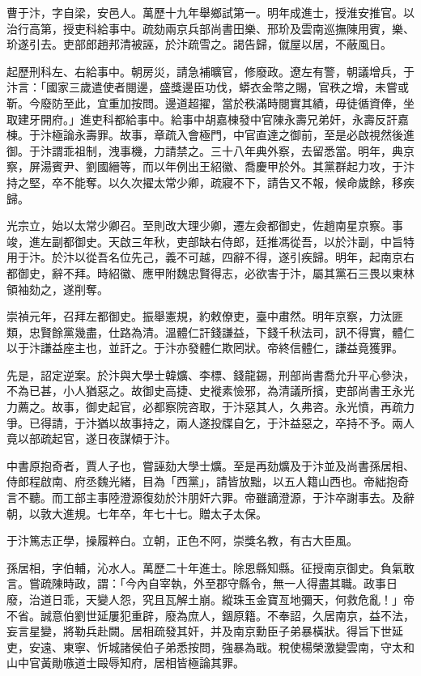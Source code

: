 \begin{pinyinscope}
曹于汴，字自梁，安邑人。萬歷十九年舉鄉試第一。明年成進士，授淮安推官。以治行高第，授吏科給事中。疏劾兩京兵部尚書田樂、邢玠及雲南巡撫陳用賓，樂、玠遂引去。吏部郎趙邦清被誣，於汴疏雪之。謁告歸，僦屋以居，不蔽風日。

起歷刑科左、右給事中。朝房災，請急補曠官，修廢政。遼左有警，朝議增兵，于汴言：「國家三歲遣使者閱邊，盛獎邊臣功伐，蟒衣金幣之賜，官秩之增，未嘗或靳。今廢防至此，宜重加按問。邊道超擢，當於秩滿時閱實其績，毋徒循資俸，坐取建牙開府。」進吏科都給事中。給事中胡嘉棟發中官陳永壽兄弟奸，永壽反訐嘉棟。于汴極論永壽罪。故事，章疏入會極門，中官直達之御前，至是必啟視然後進御。于汴謂乖祖制，洩事機，力請禁之。三十八年典外察，去留悉當。明年，典京察，屏湯賓尹、劉國縉等，而以年例出王紹徽、喬慶甲於外。其黨群起力攻，于汴持之堅，卒不能奪。以久次擢太常少卿，疏寢不下，請告又不報，候命歲餘，移疾歸。

光宗立，始以太常少卿召。至則改大理少卿，遷左僉都御史，佐趙南星京察。事竣，進左副都御史。天啟三年秋，吏部缺右侍郎，廷推馮從吾，以於汴副，中旨特用于汴。於汴以從吾名位先己，義不可越，四辭不得，遂引疾歸。明年，起南京右都御史，辭不拜。時紹徽、應甲附魏忠賢得志，必欲害于汴，屬其黨石三畏以東林領袖劾之，遂削奪。

崇禎元年，召拜左都御史。振舉憲規，約敕僚吏，臺中肅然。明年京察，力汰匪類，忠賢餘黨幾盡，仕路為清。溫體仁訐錢謙益，下錢千秋法司，訊不得實，體仁以于汴謙益座主也，並訐之。于汴亦發體仁欺罔狀。帝終信體仁，謙益竟獲罪。

先是，詔定逆案。於汴與大學士韓爌、李標、錢龍錫，刑部尚書喬允升平心參決，不為已甚，小人猶惡之。故御史高捷、史褷素憸邪，為清議所擯，吏部尚書王永光力薦之。故事，御史起官，必都察院咨取，于汴惡其人，久弗咨。永光憤，再疏力爭。已得請，于汴猶以故事持之，兩人遂投牒自乞，于汴益惡之，卒持不予。兩人竟以部疏起官，遂日夜謀傾于汴。

中書原抱奇者，賈人子也，嘗誣劾大學士爌。至是再劾爌及于汴並及尚書孫居相、侍郎程啟南、府丞魏光緒，目為「西黨」，請皆放黜，以五人籍山西也。帝絀抱奇言不聽。而工部主事陸澄源復劾於汴朋奸六罪。帝雖謫澄源，于汴卒謝事去。及辭朝，以敦大進規。七年卒，年七十七。贈太子太保。

于汴篤志正學，操履粹白。立朝，正色不阿，崇獎名教，有古大臣風。

孫居相，字伯輔，沁水人。萬歷二十年進士。除恩縣知縣。征授南京御史。負氣敢言。嘗疏陳時政，謂：「今內自宰執，外至郡守縣令，無一人得盡其職。政事日廢，治道日乖，天變人怨，究且瓦解土崩。縱珠玉金寶亙地彌天，何救危亂！」帝不省。誠意伯劉世延屢犯重辟，廢為庶人，錮原籍。不奉詔，久居南京，益不法，妄言星變，將勒兵赴闕。居相疏發其奸，并及南京勳臣子弟暴橫狀。得旨下世延吏，安遠、東寧、忻城諸侯伯子弟悉按問，強暴為戢。稅使楊榮激變雲南，守太和山中官黃勛嗾道士毆辱知府，居相皆極論其罪。


\end{pinyinscope}
